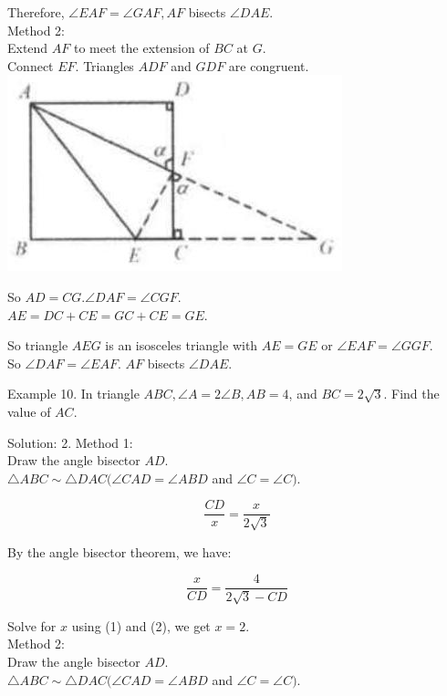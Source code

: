 \documentclass[10pt]{article}
\begin{document}
Therefore, \(\angle E A F=\angle G A F, A F\) bisects \(\angle D A E\).\\
Method 2:\\
Extend \(A F\) to meet the extension of \(B C\) at \(G\).\\
Connect \(E F\). Triangles \(A D F\) and \(G D F\) are congruent.\\
\includegraphics[max width=\textwidth, center]{2025_04_17_97bc1f7e44d93c271a88g-060(2)}

So \(A D=C G . \angle D A F=\angle C G F\).\\
\(A E=D C+C E=G C+C E=G E\).

So triangle \(A E G\) is an isosceles triangle with \(A E=G E\) or \(\angle E A F=\angle G G F\).\\
So \(\angle D A F=\angle E A F\). \(A F\) bisects \(\angle D A E\).

Example 10. In triangle \(A B C, \angle A=2 \angle B, A B=4\), and \(B C=2 \sqrt{3}\). Find the value of \(A C\).

Solution: 2.
Method 1:\\
Draw the angle bisector \(A D\).\\
\(\triangle A B C \sim \triangle D A C(\angle C A D=\angle A B D\) and \(\angle C=\angle C)\).

\[
\frac{C D}{x}=\frac{x}{2 \sqrt{3}}
\]

By the angle bisector theorem, we have:

\[
\frac{x}{C D}=\frac{4}{2 \sqrt{3}-C D}
\]

Solve for \(x\) using (1) and (2), we get \(x=2\).\\
Method 2:\\
Draw the angle bisector \(A D\).\\
\(\triangle A B C \sim \triangle D A C(\angle C A D=\angle A B D\) and \(\angle C=\angle C)\).
\end{document}
